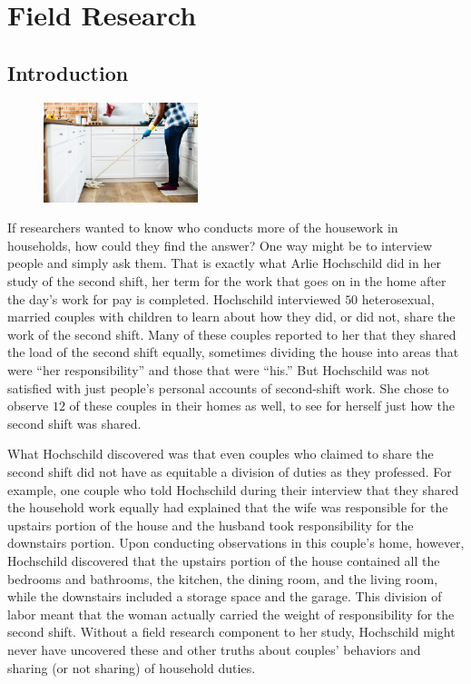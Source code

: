 \chapter{Field Research}\label{ch11:field_research}
\section{Introduction}

\begin{figure}
	\centering
	\includegraphics[width=0.4\textwidth]{gfx/11-mop} 
\end{figure}

If researchers wanted to know who conducts more of the housework in households, how could they find the answer? One way might be to interview people and simply ask them. That is exactly what Arlie Hochschild did in her study of the second shift, her term for the work that goes on in the home after the day's work for pay is completed\cite{hochschild2012second}. Hochschild interviewed $ 50 $ heterosexual, married couples with children to learn about how they did, or did not, share the work of the second shift. Many of these couples reported to her that they shared the load of the second shift equally, sometimes dividing the house into areas that were ``her responsibility'' and those that were ``his.'' But Hochschild was not satisfied with just people's personal accounts of second-shift work. She chose to observe $ 12 $ of these couples in their homes as well, to see for herself just how the second shift was shared.

What Hochschild discovered was that even couples who claimed to share the second shift did not have as equitable a division of duties as they professed. For example, one couple who told Hochschild during their interview that they shared the household work equally had explained that the wife was responsible for the upstairs portion of the house and the husband took responsibility for the downstairs portion. Upon conducting observations in this couple's home, however, Hochschild discovered that the upstairs portion of the house contained all the bedrooms and bathrooms, the kitchen, the dining room, and the living room, while the downstairs included a storage space and the garage. This division of labor meant that the woman actually carried the weight of responsibility for the second shift. Without a field research component to her study, Hochschild might never have uncovered these and other truths about couples' behaviors and sharing (or not sharing) of household duties.

